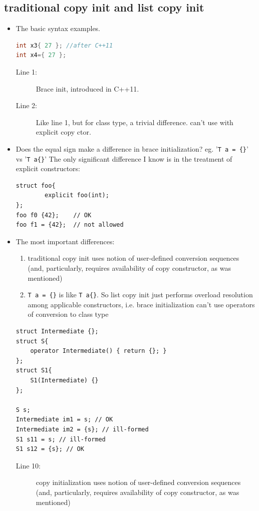 \documentclass[a4paper,11pt,twoside]{book}
\begin{document}
\subsection{traditional copy init and list copy init}
\begin{itemize}
	\item The basic syntax examples. 
\begin{lstlisting}[frame=single, language=c++,mathescape=true]
int x3{ 27 }; //after C++11
int x4={ 27 }; 
\end{lstlisting}
	\begin{description}
		\item[Line 1:] Brace init, introduced in C++11.
		\item[Line 2:] Like line 1, but for class type, a trivial difference. can't use with explicit copy ctor.
	\end{description}

	\item Does the equal sign make a difference in brace initialization? eg. '\texttt{T a = \{\}}' vs '\texttt{T a\{\}}' The only significant difference I know is in the treatment of explicit constructors:
	
\begin{lstlisting}
struct foo{
		explicit foo(int);
};
foo f0 {42};    // OK
foo f1 = {42};  // not allowed
\end{lstlisting}

	
	\item The most important differences:
	\begin{enumerate}
		\item traditional copy init uses notion of user-defined conversion sequences (and, particularly, requires availability of copy constructor, as was mentioned)
		
		\item \texttt{T a = \{\}} is like \texttt{T a\{\}}. So list copy init just performs overload resolution among applicable constructors, i.e. brace initialization can't use operators of conversion to class type
	\end{enumerate}
\begin{lstlisting}
struct Intermediate {};
struct S{
	operator Intermediate() { return {}; }
};
struct S1{
	S1(Intermediate) {}
};
	
S s;
Intermediate im1 = s; // OK
Intermediate im2 = {s}; // ill-formed
S1 s11 = s; // ill-formed
S1 s12 = {s}; // OK
\end{lstlisting}
	
	\begin{description}
		\item[Line 10:] copy initialization uses notion of user-defined conversion sequences (and, particularly, requires availability of copy constructor, as was mentioned)
		

\end{description}
\end{itemize}
\end{document}
